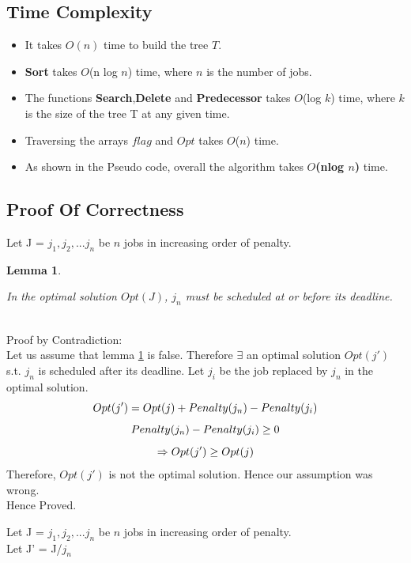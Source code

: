 \documentclass[pdftex,a4paper,12pt]{report}
\newtheorem{lemma}[theorem]{Lemma}
\newenvironment{proof}[1][Proof]{\begin{trivlist}
\item[\hskip \labelsep {\bfseries #1}]}{\end{trivlist}}
\begin{document}
\subsection{Time Complexity}
\begin{itemize}
\item It takes $O(n)$ time to build the tree $T$.
\item \textbf{Sort} takes $O$(n log $n$) time, where $n$ is the number of jobs.
\item The functions \textbf{Search},\textbf{Delete} and \textbf{Predecessor} takes $O$(log $k$) time, where $k$ is the size of the tree T at any given time. 
\item Traversing the arrays $flag$ and $Opt$ takes $O$($n$) time.
\item As shown in the Pseudo code, overall the algorithm takes  \textbf{$O$(nlog $n$)} time.
\end{itemize}
\subsection{Proof Of Correctness}
Let J = $j_{1},j_{2},...j_{n}$ be $n$ jobs in increasing order of penalty.
\begin{lemma}
\mbox{}
\label{lemma}
\begin{center}

In the optimal solution $Opt(J)$, $j_{n}$ must be scheduled at or before its deadline.

\end{center}
\end{lemma}
\begin{proof}
\mbox{}\\
{Proof by Contradiction:}\\
Let us assume that lemma \ref{lemma} is false. Therefore $\exists$ an optimal solution $Opt(j')$ s.t. $j_{n}$ is scheduled after its deadline. Let $j_{i}$ be the job replaced by $j_{n}$ in the optimal solution.
\begin{equation}
Opt(j') = Opt(j)+Penalty(\texttt{$j_{n}$}) - Penalty(\texttt{$j_{i}$})\\
\end{equation}
\begin{equation}
Penalty(\texttt{$j_{n}$}) - Penalty(\texttt{$j_{i}$}) \geq 0 \\
\end{equation}
\begin{equation}
\Rightarrow Opt(j')\geq Opt(j)\\
\end{equation}
Therefore, $Opt(j')$ is not the optimal solution. Hence our assumption was wrong.\\
Hence Proved.
\end{proof}
Let J = $j_{1},j_{2},...j_{n}$ be $n$ jobs in increasing order of penalty.\\
Let J' = J/$j_{n}$\\
\end{document}

